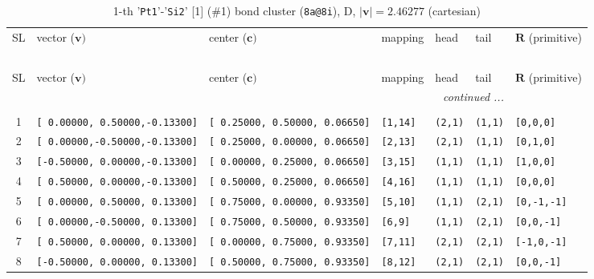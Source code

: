 \documentclass[fleqn,10pt,landscape]{jsarticle}
\begin{document}
\renewcommand{\arraystretch}{1.6}
\begin{longtable}[l]{cllllll}
\captionsetup{justification=raggedright, singlelinecheck=off}
\caption{1-th '\texttt{Pt1}'-'\texttt{Si2}' [1] (\#1) bond cluster (\texttt{8a@8i}), D, $|\bm{v}|=2.46277$ (cartesian)}
 \\
 \hline \hline
SL & vector ($\bm{v})$ & center ($\bm{c})$ & mapping & head & tail & $\bm{R}$ (primitive) \\ \hline \endfirsthead

\multicolumn{6}{l}{\tablename\ \thetable{}} \\
 \hline \hline
SL & vector ($\bm{v})$ & center ($\bm{c})$ & mapping & head & tail & $\bm{R}$ (primitive) \\ \hline \endhead

 \hline \hline
\multicolumn{6}{r}{\footnotesize\it continued ...} \\ \endfoot

 \hline \hline
\multicolumn{6}{r}{} \\ \endlastfoot

1 & \texttt{[ 0.00000, 0.50000,-0.13300]} & \texttt{[ 0.25000, 0.50000, 0.06650]} & \texttt{[1,14]} & \texttt{(2,1)} & \texttt{(1,1)} & \texttt{[0,0,0]} \\ \hline
2 & \texttt{[ 0.00000,-0.50000,-0.13300]} & \texttt{[ 0.25000, 0.00000, 0.06650]} & \texttt{[2,13]} & \texttt{(2,1)} & \texttt{(1,1)} & \texttt{[0,1,0]} \\ \hline
3 & \texttt{[-0.50000, 0.00000,-0.13300]} & \texttt{[ 0.00000, 0.25000, 0.06650]} & \texttt{[3,15]} & \texttt{(1,1)} & \texttt{(1,1)} & \texttt{[1,0,0]} \\ \hline
4 & \texttt{[ 0.50000, 0.00000,-0.13300]} & \texttt{[ 0.50000, 0.25000, 0.06650]} & \texttt{[4,16]} & \texttt{(1,1)} & \texttt{(1,1)} & \texttt{[0,0,0]} \\ \hline
5 & \texttt{[ 0.00000, 0.50000, 0.13300]} & \texttt{[ 0.75000, 0.00000, 0.93350]} & \texttt{[5,10]} & \texttt{(1,1)} & \texttt{(2,1)} & \texttt{[0,-1,-1]} \\ \hline
6 & \texttt{[ 0.00000,-0.50000, 0.13300]} & \texttt{[ 0.75000, 0.50000, 0.93350]} & \texttt{[6,9]} & \texttt{(1,1)} & \texttt{(2,1)} & \texttt{[0,0,-1]} \\ \hline
7 & \texttt{[ 0.50000, 0.00000, 0.13300]} & \texttt{[ 0.00000, 0.75000, 0.93350]} & \texttt{[7,11]} & \texttt{(2,1)} & \texttt{(2,1)} & \texttt{[-1,0,-1]} \\ \hline
8 & \texttt{[-0.50000, 0.00000, 0.13300]} & \texttt{[ 0.50000, 0.75000, 0.93350]} & \texttt{[8,12]} & \texttt{(2,1)} & \texttt{(2,1)} & \texttt{[0,0,-1]} \\
\end{longtable}
\end{document}
